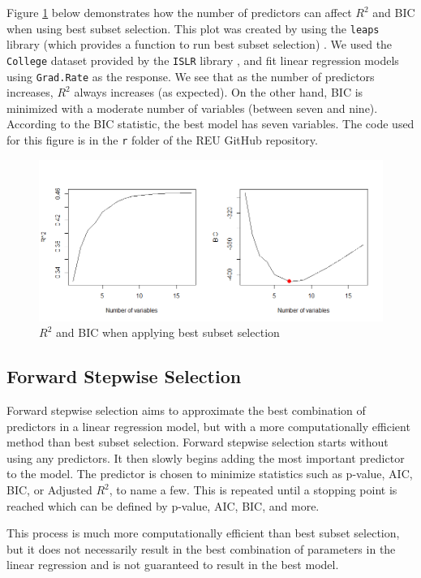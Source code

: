 \documentclass{article}
\begin{document}
Figure \ref{fig:best-subset-selection} below demonstrates how the number of predictors can affect $R^2$ and BIC when using best subset selection. This plot was created by using the \lstinline!leaps! library (which provides a function to run best subset selection) \cite{lumley2020leaps}. We used the \lstinline!College! dataset provided by the \lstinline!ISLR! library \cite{james2017islr}, and fit linear regression models using \lstinline!Grad.Rate! as the response. We see that as the number of predictors increases, $R^2$ always increases (as expected). On the other hand, BIC is minimized with a moderate number of variables (between seven and nine). According to the BIC statistic, the best model has seven variables. The code used for this figure is in the \lstinline!r! folder of the REU GitHub repository.

\begin{figure}[!h]
	\label{fig:best-subset-selection}
	\centering
	\caption{$R^2$ and BIC when applying best subset selection}
	\includegraphics[width = 6in]{best-subset-selection.png}
\end{figure}

\subsection{Forward Stepwise Selection}
Forward stepwise selection aims to approximate the best combination of predictors in a linear regression model, but with a more computationally efficient method than best subset selection. Forward stepwise selection starts without using any predictors. It then slowly begins adding the most important predictor to the model. The predictor is chosen to minimize statistics such as p-value, AIC, BIC, or Adjusted $R^2$, to name a few. This is repeated until a stopping point is reached which can be defined by p-value, AIC, BIC, and more.

This process is much more computationally efficient than best subset selection, but it does not necessarily result in the best combination of parameters in the linear regression and is not guaranteed to result in the best model.
\end{document}
